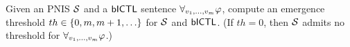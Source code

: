 \begin{definition}
  Given an PNIS $\mathcal{S}$ and a $\sf{bICTL}$ sentence $\forall_{v_1,\ldots,v_m} \varphi$, compute an
  emergence threshold $th \in \left \{ 0, m, m+1, \ldots \right \}$ for $\mathcal{S}$ and $\sf{bICTL}$.
  (If $th=0$, then $\mathcal{S}$ admits no threshold for $\forall_{v_1,\ldots,v_m} \varphi$.)
\end{definition}
  







